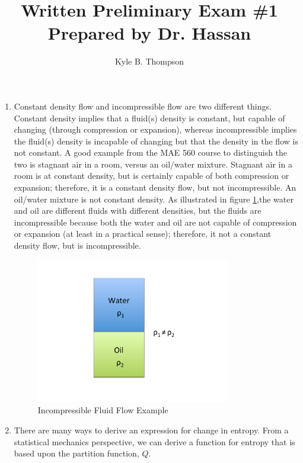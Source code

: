 \documentclass[a4paper]{report}
\title{Written Preliminary Exam \#1 \break
       Prepared by Dr. Hassan}
\author{ Kyle B. Thompson }
\begin{document}
\maketitle

\begin{enumerate}
  \item Constant density flow and incompressible flow are two different things.
    Constant density implies that a fluid(s) density is constant, but capable of
    changing (through compression or expansion), whereas incompressible implies
    the fluid(s) density is incapable of changing but that the density in the
    flow is not constant.  A good example from the MAE 560 course to distinguish
    the two is stagnant air in a room, versus an oil/water mixture.  Stagnant
    air in a room is at constant density, but is certainly capable of both
    compression or expansion; therefore, it is a constant density flow, but not
    incompressible.  An oil/water mixture is not constant density.  As
    illustrated in figure \ref{fig:incompressible},the
    water and oil are different fluids with different densities, but the fluids
    are incompressible because both the water and oil are not capable of
    compression or expansion (at least in a practical sense); therefore, it not
    a constant density flow, but is incompressible.

    \begin{figure}[h]
      \centering
      \includegraphics[width=0.8\textwidth,trim={0 2cm 0 2cm},clip]{oil_water_fig}
      \caption{Incompressible Fluid Flow Example}
      \label{fig:incompressible}
    \end{figure}

  \item There are many ways to derive an expression for change in entropy.
    From a statistical mechanics perspective, we can derive a function for
    entropy that is based upon the partition function, $Q$.

\end{enumerate}
\end{document}
